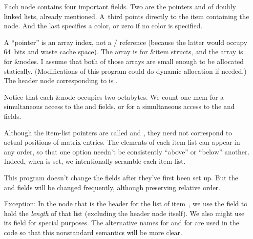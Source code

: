 Each node contains four important fields. Two are the pointers 
and  of doubly linked lists, already mentioned.
A~third points directly to the item containing the node.
And the last specifies a color, or zero if no color is specified.

A ``pointer'' is an array index, not a \CEE/ reference (because the latter
would occupy 64~bits and waste cache space). The  array is for
\&{item} structs, and the  array is for \&{node}s. I assume that
both of
those arrays are small enough to be allocated statically. (Modifications
of this program could do dynamic allocation if needed.)
The header node corresponding to  is .

Notice that each \&{node} occupies two octabytes.
We count one mem for a simultaneous access to the  and 
fields,
or for a simultaneous access to the  and  fields.

Although the item-list pointers are called  and , they
need not
correspond to actual positions of matrix entries. The elements of
each item list can appear in any order, so that one option
needn't be consistently ``above'' or ``below'' another. Indeed, when
 is set, we intentionally scramble each item list.

This program doesn't change the  fields after they've first been
set up.
But the  and  fields will be changed frequently,
although preserving
relative order.

Exception: In the node  that is the header for the list of
item~, we use the  field to hold the {\it length\/} of that
list (excluding the header node itself).
We also might use its  field for special purposes.
The alternative names  for  and  for 
are used in the code so that this nonstandard semantics will be more clear.

